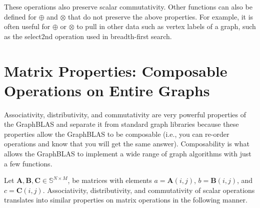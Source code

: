 These operations also preserve scalar commutativity. Other functions can also be defined for $\oplus$ and $\otimes$ that do not preserve the above properties.  For example, it is often useful for $\oplus$ or $\otimes$ to pull in other data such as vertex labels of a graph, such as the select2nd operation used in breadth-first search. 

\section{Matrix Properties: Composable Operations on Entire Graphs}
  Associativity, distributivity, and commutativity are very powerful properties of the GraphBLAS and separate it from standard graph libraries because these properties allow the GraphBLAS to be composable (i.e., you can re-order operations and know that you will get the same answer).  Composability is what allows the GraphBLAS to implement a wide range of graph algorithms with just a few functions.

  Let $\mathbf{A}, \mathbf{B}, \mathbf{C} \in \mathbb{S}^{N \times M}$, be matrices with elements $a = \mathbf{A}(i,j)$, $b = \mathbf{B}(i,j)$, and $c = \mathbf{C}(i,j)$.  Associativity, distributivity, and commutativity of scalar operations translates into similar properties on matrix operations in the following manner.

